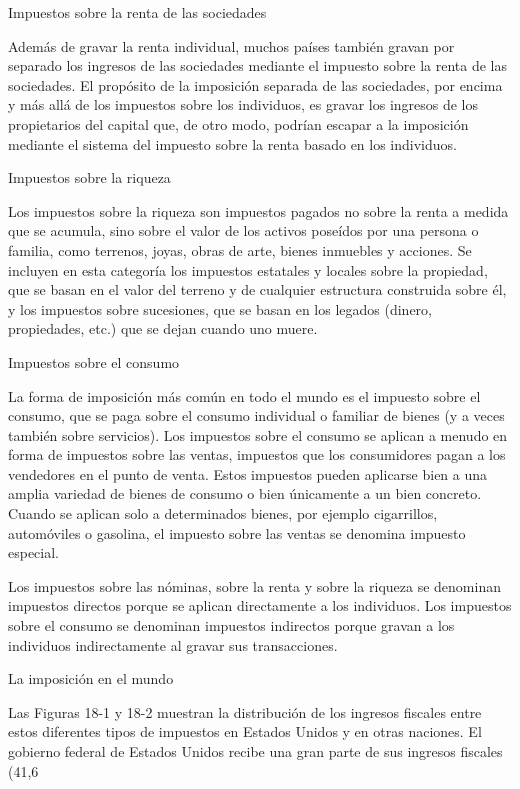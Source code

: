 \documentclass[10pt,a4paper]{article}
\begin{document}
{Impuestos sobre la renta de las sociedades

Además de gravar la renta individual, muchos países también gravan por separado los ingresos de las sociedades mediante el impuesto sobre la renta de las sociedades. El propósito de la imposición separada de las sociedades, por encima y más allá de los impuestos sobre los individuos, es gravar los ingresos de los propietarios del capital que, de otro modo, podrían escapar a la imposición mediante el sistema del impuesto sobre la renta basado en los individuos.

Impuestos sobre la riqueza

Los impuestos sobre la riqueza son impuestos pagados no sobre la renta a medida que se acumula, sino sobre el valor de los activos poseídos por una persona o familia, como terrenos, joyas, obras de arte, bienes inmuebles y acciones. Se incluyen en esta categoría los impuestos estatales y locales sobre la propiedad, que se basan en el valor del terreno y de cualquier estructura construida sobre él, y los impuestos sobre sucesiones, que se basan en los legados (dinero, propiedades, etc.) que se dejan cuando uno muere.

Impuestos sobre el consumo

La forma de imposición más común en todo el mundo es el impuesto sobre el consumo, que se paga sobre el consumo individual o familiar de bienes (y a veces también sobre servicios). Los impuestos sobre el consumo se aplican a menudo en forma de impuestos sobre las ventas, impuestos que los consumidores pagan a los vendedores en el punto de venta. Estos impuestos pueden aplicarse bien a una amplia variedad de bienes de consumo o bien únicamente a un bien concreto. Cuando se aplican solo a determinados bienes, por ejemplo cigarrillos, automóviles o gasolina, el impuesto sobre las ventas se denomina impuesto especial.

Los impuestos sobre las nóminas, sobre la renta y sobre la riqueza se denominan impuestos directos porque se aplican directamente a los individuos. Los impuestos sobre el consumo se denominan impuestos indirectos porque gravan a los individuos indirectamente al gravar sus transacciones.

La imposición en el mundo

Las Figuras 18-1 y 18-2 muestran la distribución de los ingresos fiscales entre estos diferentes tipos de impuestos en Estados Unidos y en otras naciones. El gobierno federal de Estados Unidos recibe una gran parte de sus ingresos fiscales (41,6 %

}
\end{document}
